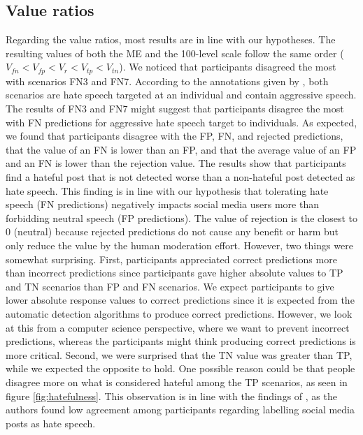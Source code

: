 \subsection{Value ratios}
\label{sec:discussion-value-ratios}
%
Regarding the value ratios, most results are in line with our hypotheses.
%
The resulting values of both the ME and the 100-level scale follow the same order ($V_{fn} < V_{fp} < V_{r} < V_{tp} < V_{tn}$).
%
We noticed that participants disagreed the most with scenarios FN3 and FN7.
%
According to the annotations given by \citet{basile2019semeval}, both scenarios are hate speech targeted at an individual and contain aggressive speech.
%
The results of FN3 and FN7 might suggest that participants disagree the most with FN predictions for aggressive hate speech target to individuals.
%
As expected, we found that participants disagree with the FP, FN, and rejected predictions, that the value of an FN is lower than an FP, and that the average value of an FP and an FN is lower than the rejection value.
%
The results show that participants find a hateful post that is not detected worse than a non-hateful post detected as hate speech.
%
This finding is in line with our hypothesis that tolerating hate speech (FN predictions) negatively impacts social media users more than forbidding neutral speech (FP predictions).
%
The value of rejection is the closest to 0 (neutral) because rejected predictions do not cause any benefit or harm but only reduce the value by the human moderation effort.
%
However, two things were somewhat surprising.
%
First, participants appreciated correct predictions more than incorrect predictions since participants gave higher absolute values to TP and TN scenarios than FP and FN scenarios.
%
We expect participants to give lower absolute response values to correct predictions since it is expected from the automatic detection algorithms to produce correct predictions.
%
However, we look at this from a computer science perspective, where we want to prevent incorrect predictions, whereas the participants might think producing correct predictions is more critical.
%
Second, we were surprised that the TN value was greater than TP, while we expected the opposite to hold.
%
One possible reason could be that people disagree more on what is considered hateful among the TP scenarios, as seen in figure \ref{fig:hatefulness}.
%
This observation is in line with the findings of \citet{ross2017measuring}, as the authors found low agreement among participants regarding labelling social media posts as hate speech.
%


